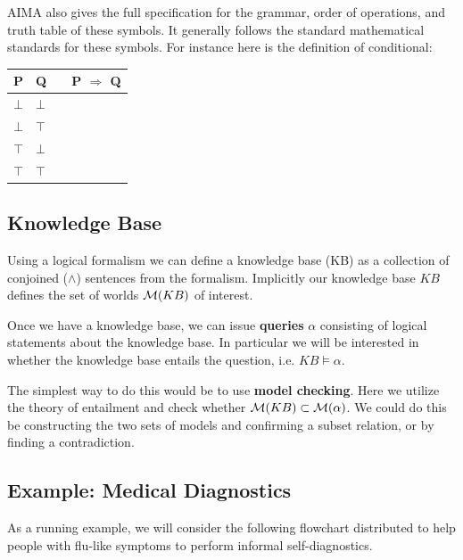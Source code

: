 \documentclass[11pt]{article}
\begin{document}
\noindent AIMA also gives the full specification for the grammar, order of operations, and truth table of these symbols. It generally 
follows the standard mathematical standards for these symbols. For instance here is the definition of conditional:


\air 
\begin{center}
  \begin{tabular}{lllc}
    \toprule
    P & Q && P $\Rightarrow$ Q  \\
    \midrule
    $\bot$ & $\bot$ && \censor{$\top$} \\
    $\bot$ & $\top$ && \censor{$\top$} \\
    $\top$ & $\bot$ && \censor{$\bot$} \\
    $\top$ & $\top$ && \censor{$\top$} \\
    \bottomrule
  \end{tabular}
\end{center}
\air

\subsection{Knowledge Base}

Using a logical formalism we can define a knowledge base (KB) as a collection of 
conjoined ($\land$) sentences from the formalism. Implicitly our knowledge base $KB$
defines the set of worlds $\mathcal{M}(KB)$ of interest. 

Once we have a knowledge base, we can issue \textbf{queries} $\alpha$ consisting of logical 
statements about the knowledge base. In particular we will be interested in whether 
the knowledge base entails the question, i.e. $KB \models \alpha$. 

The simplest way to do this would be to use \textbf{model checking}. Here we utilize the theory of entailment and check whether $\mathcal{M}(KB) \subset \mathcal{M}(\alpha)$. We could do this be constructing the two sets of models and confirming a subset relation, or by finding a contradiction.


\subsection{Example: Medical Diagnostics}

As a running example, we will consider the following flowchart distributed to help people with flu-like symptoms to perform informal self-diagnostics. 

\end{document}
